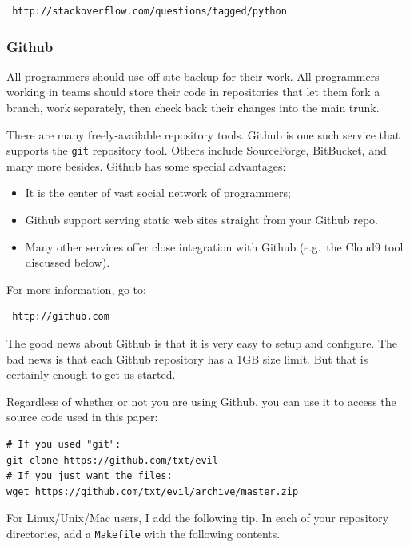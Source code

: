 \begin{lstlisting}
 http://stackoverflow.com/questions/tagged/python
\end{lstlisting}

\subsubsection{Github}\label{github}

All programmers should use off-site backup for their work. All
programmers working in teams should store their code in repositories
that let them fork a branch, work separately, then check back their
changes into the main trunk.

There are many freely-available repository tools. Github is one such
service that supports the \texttt{git} repository tool. Others include
SourceForge, BitBucket, and many more besides. Github has some special
advantages:

\begin{itemize}
\itemsep1pt\parskip0pt
\item
  It is the center of vast social network of programmers;
\item
  Github support serving static web sites straight from your Github
  repo.
\item
  Many other services offer close integration with Github (e.g.~the
  Cloud9 tool discussed below).
\end{itemize}

For more information, go to:

\begin{lstlisting}
 http://github.com
\end{lstlisting}

The good news about Github is that it is very easy to setup and
configure. The bad news is that each Github repository has a 1GB size
limit. But that is certainly enough to get us started.

Regardless of whether or not you are using Github, you can use it to
access the source code used in this paper:

\begin{lstlisting}
# If you used "git":
git clone https://github.com/txt/evil
# If you just want the files:
wget https://github.com/txt/evil/archive/master.zip 
\end{lstlisting}

For Linux/Unix/Mac users, I add the following tip. In each of your
repository directories, add a \texttt{Makefile} with the following
contents.

